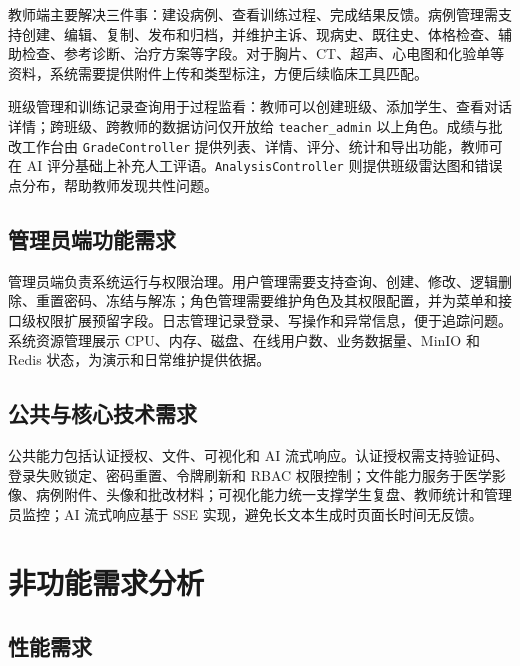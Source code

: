 教师端主要解决三件事：建设病例、查看训练过程、完成结果反馈。病例管理需支持创建、编辑、复制、发布和归档，并维护主诉、现病史、既往史、体格检查、辅助检查、参考诊断、治疗方案等字段。对于胸片、CT、超声、心电图和化验单等资料，系统需要提供附件上传和类型标注，方便后续临床工具匹配。

班级管理和训练记录查询用于过程监看：教师可以创建班级、添加学生、查看对话详情；跨班级、跨教师的数据访问仅开放给 \texttt{teacher\_admin} 以上角色。成绩与批改工作台由 \texttt{GradeController} 提供列表、详情、评分、统计和导出功能，教师可在 AI 评分基础上补充人工评语。\texttt{AnalysisController} 则提供班级雷达图和错误点分布，帮助教师发现共性问题。

\subsection{管理员端功能需求}

管理员端负责系统运行与权限治理。用户管理需要支持查询、创建、修改、逻辑删除、重置密码、冻结与解冻；角色管理需要维护角色及其权限配置，并为菜单和接口级权限扩展预留字段。日志管理记录登录、写操作和异常信息，便于追踪问题。系统资源管理展示 CPU、内存、磁盘、在线用户数、业务数据量、MinIO 和 Redis 状态，为演示和日常维护提供依据。

\subsection{公共与核心技术需求}

公共能力包括认证授权、文件、可视化和 AI 流式响应。认证授权需支持验证码、登录失败锁定、密码重置、令牌刷新和 RBAC 权限控制；文件能力服务于医学影像、病例附件、头像和批改材料；可视化能力统一支撑学生复盘、教师统计和管理员监控；AI 流式响应基于 SSE 实现，避免长文本生成时页面长时间无反馈。

\section{非功能需求分析}

\subsection{性能需求}

